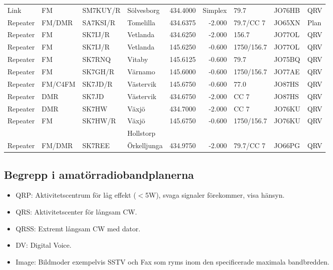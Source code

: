 \begin{longtable}{llllrrlll}
Link     & FM              & SM7KUY/R & Sölvesborg   & 434.4000     & Simplex    & 79.7         & JO76HB      & QRV      \\
Repeater & FM/DMR          & SA7KSI/R & Tomelilla    & 434.6375     & -2.000     & 79.7/CC 7    & JO65XN      & Plan     \\
Repeater & FM              & SK7IJ/R  & Vetlanda     & 434.6250     & -2.000     & 156.7        & JO77OL      & QRV      \\
Repeater & FM              & SK7IJ/R  & Vetlanda     & 145.6250     & -0.600     & 1750/156.7   & JO77OL      & QRV      \\
Repeater & FM              & SK7RNQ   & Vitaby       & 145.6125     & -0.600     & 79.7         & JO75BQ      & QRV      \\
Repeater & FM              & SK7GH/R  & Värnamo      & 145.6000     & -0.600     & 1750/156.7   & JO77AE      & QRV      \\
Repeater & FM/C4FM         & SK7JD/R  & Västervik    & 145.6750     & -0.600     & 77.0         & JO87HS      & QRV      \\
Repeater & DMR             & SK7JD    & Västervik    & 434.6750     & -2.000     & CC 7         & JO87HS      & QRV      \\
Repeater & DMR             & SK7HW    & Växjö        & 434.7000     & -2.000     & CC 7         & JO76KU      & QRV      \\
Repeater & FM              & SK7HW/R  & Växjö        & 145.6750     & -0.600     & 1750/156.7   & JO76KU      & QRV      \\
         &                 &          & Hollstorp    &              &            &              &             &          \\
Repeater & FM/DMR          & SK7REE   & Örkelljunga  & 434.9750     & -2.000     & 79.7/CC 7    & JO66PG      & QRV      \\
\end{longtable}
\normalsize

\clearpage

\subsection{Begrepp i amatörradiobandplanerna}

\begin{itemize}
\item QRP: Aktivitetscentrum för låg effekt ($<$5W), svaga signaler
      förekommer, visa hänsyn.
\item QRS: Aktivitetscenter för långsam CW.
\item QRSS: Extremt långsam CW med dator.
\item DV: Digital Voice.
\item Image: Bildmoder exempelvis SSTV och Fax som ryms inom den specificerade
	  maximala bandbredden.
\end{itemize}

